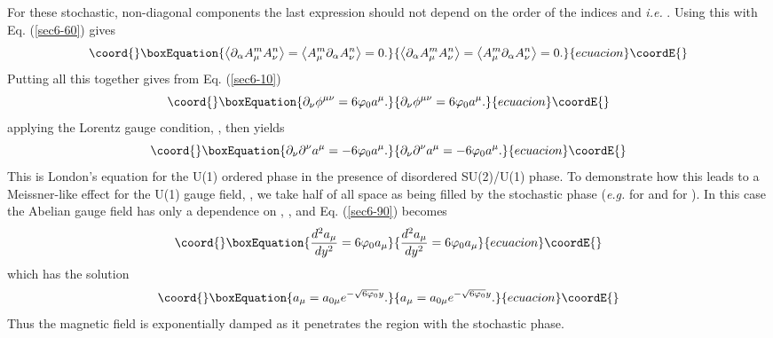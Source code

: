 \documentclass[a4paper,aps,showpacs]{revtex4}
\begin{document}
For these stochastic, non-diagonal components the last expression
should not depend on the order of the indices \coordHE{} and
\myHighlight{$(\mu , \nu)$}\coordHE{}  \textit{i.e.}
\coordHE{}.
Using this with Eq. (\ref{sec6-60}) gives
\begin{equation}\coord{}\boxEquation{
\left\langle \partial_\alpha A^m_\mu A^n_\nu \right\rangle =
\left\langle A^m_\mu \partial_\alpha A^n_\nu \right\rangle = 0.
\label{sec6-70}
}{
\left\langle \partial_\alpha A^m_\mu A^n_\nu \right\rangle =
\left\langle A^m_\mu \partial_\alpha A^n_\nu \right\rangle = 0.
}{ecuacion}\coordE{}\end{equation}
Putting all this together gives from Eq. (\ref{sec6-10})
\begin{equation}\coord{}\boxEquation{
  \partial_\nu \phi ^{\mu\nu} = 6 \varphi_0 a^\mu .
\label{sec6-80}
}{
  \partial_\nu \phi ^{\mu\nu} = 6 \varphi_0 a^\mu .
}{ecuacion}\coordE{}\end{equation}
applying the Lorentz gauge condition, \coordHE{},
then yields
\begin{equation}\coord{}\boxEquation{
  \partial_\nu \partial^\nu a^\mu = -6 \varphi_0 a^\mu .
\label{sec6-90}
}{
  \partial_\nu \partial^\nu a^\mu = -6 \varphi_0 a^\mu .
}{ecuacion}\coordE{}\end{equation}
This is London's equation for the U(1) ordered phase
in the presence of disordered SU(2)/U(1) phase. To demonstrate
how this leads to a Meissner-like effect for the U(1) gauge
field, \coordHE{}, we take half of all space
as being filled by the stochastic phase  ({\it e.g.}
\coordHE{} for \coordHE{}
and \coordHE{} for \coordHE{}).
In this case the Abelian gauge field has only a dependence
on \coordHE{}, \coordHE{}, and Eq. (\ref{sec6-90}) becomes
\begin{equation}\coord{}\boxEquation{
  \frac{d^2 a_\mu}{dy^2} = 6 \varphi_0 a_\mu
\label{sec7-10}
}{
  \frac{d^2 a_\mu}{dy^2} = 6 \varphi_0 a_\mu
}{ecuacion}\coordE{}\end{equation}
which has the solution
\begin{equation}\coord{}\boxEquation{
  a_\mu = a_{0 \mu} e^{-\sqrt{6\varphi_0} y} .
\label{sec7-20}
}{
  a_\mu = a_{0 \mu} e^{-\sqrt{6\varphi_0} y} .
}{ecuacion}\coordE{}\end{equation}
Thus the magnetic field \coordHE{} is
exponentially damped as it penetrates the region with the
stochastic phase.
\end{document}
